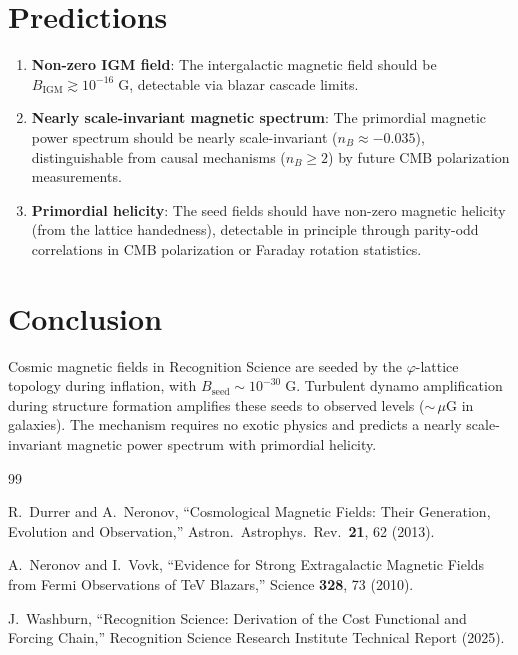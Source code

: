 \documentclass[12pt,a4paper]{article}
\theoremstyle{definition}
\theoremstyle{remark}
\begin{document}
\section{Predictions}
\label{sec:predictions}

\begin{enumerate}
  \item \textbf{Non-zero IGM field}: The intergalactic magnetic
  field should be $B_{\mathrm{IGM}} \gtrsim 10^{-16}\;\mathrm{G}$,
  detectable via blazar cascade limits.

  \item \textbf{Nearly scale-invariant magnetic spectrum}: The
  primordial magnetic power spectrum should be nearly
  scale-invariant ($n_B \approx -0.035$), distinguishable from
  causal mechanisms ($n_B \geq 2$) by future CMB polarization
  measurements.

  \item \textbf{Primordial helicity}: The seed fields should have
  non-zero magnetic helicity (from the lattice handedness), detectable
  in principle through parity-odd correlations in CMB polarization
  or Faraday rotation statistics.
\end{enumerate}

\section{Conclusion}
\label{sec:conclusion}

Cosmic magnetic fields in Recognition Science are seeded by the
$\varphi$-lattice topology during inflation, with
$B_{\mathrm{seed}} \sim 10^{-30}\;\mathrm{G}$.  Turbulent dynamo
amplification during structure formation amplifies these seeds to
observed levels (${\sim}\,\mu\mathrm{G}$ in galaxies).  The
mechanism requires no exotic physics and predicts a nearly
scale-invariant magnetic power spectrum with primordial helicity.

\begin{thebibliography}{99}

R.~Durrer and A.~Neronov, ``Cosmological Magnetic Fields: Their
Generation, Evolution and Observation,'' Astron.\ Astrophys.\ Rev.\
\textbf{21}, 62 (2013).

A.~Neronov and I.~Vovk, ``Evidence for Strong Extragalactic
Magnetic Fields from Fermi Observations of TeV Blazars,'' Science
\textbf{328}, 73 (2010).

J.~Washburn, ``Recognition Science: Derivation of the Cost
Functional and Forcing Chain,'' Recognition Science Research
Institute Technical Report (2025).

\end{thebibliography}
\end{document}

